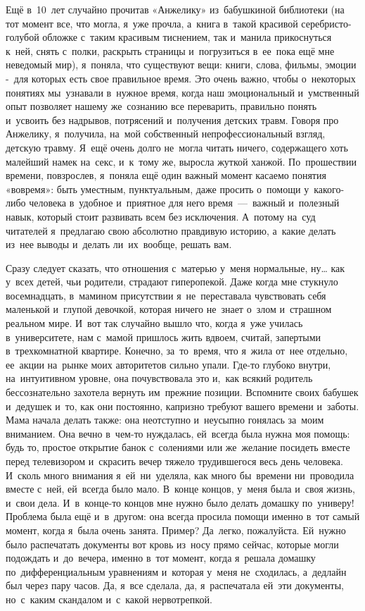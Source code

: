 
\lettrine[lines=3, loversize=0.1]{Е}{}щё в~10~лет случайно прочитав «Анжелику» из~бабушкиной библиотеки (на тот момент все, что могла, я~уже прочла, а~книга в~такой красивой серебристо-голубой обложке с~таким красивым тиснением, так и~манила прикоснуться к~ней, снять с~полки, раскрыть страницы и~погрузиться в~ее~пока ещё мне неведомый мир), я~поняла, что существуют вещи: книги, слова, фильмы, эмоции -~для которых есть свое правильное время.
Это очень важно, чтобы о~некоторых понятиях мы~узнавали в~нужное время, когда наш эмоциональный и~умственный опыт позволяет нашему же~сознанию все переварить, правильно понять и~усвоить без надрывов, потрясений и~получения детских травм.
Говоря про Анжелику, я~получила, на~мой собственный непрофессиональный взгляд, детскую травму.
Я~ещё очень долго не~могла читать ничего, содержащего хоть малейший намек на~секс, и~к~тому же, выросла жуткой ханжой.
По~прошествии времени, повзрослев, я~поняла ещё один важный момент касаемо понятия «вовремя»: быть уместным, пунктуальным, даже просить о~помощи у~какого-либо человека в~удобное и~приятное для него время~---~важный и~полезный навык, который стоит развивать всем без исключения.
А~потому на~суд читателей я~предлагаю свою абсолютно правдивую историю, а~какие делать из~нее выводы и~делать ли~их~вообще, решать вам.
 

Сразу следует сказать, что отношения с~матерью у~меня нормальные, ну… как у~всех детей, чьи родители, страдают гиперопекой.
Даже когда мне стукнуло восемнадцать, в~мамином присутствии я~не~переставала чувствовать себя маленькой и~глупой девочкой, которая ничего не~знает о~злом и~страшном реальном мире.
И~вот так случайно вышло что, когда я~уже училась в~университете, нам с~мамой пришлось жить вдвоем, считай, запертыми в~трехкомнатной квартире.
Конечно, за~то~время, что я~жила от~нее отдельно, ее~акции на~рынке моих авторитетов сильно упали.
Где-то глубоко внутри, на~интуитивном уровне, она почувствовала это и,~как всякий родитель бессознательно захотела вернуть им~прежние позиции.
Вспомните своих бабушек и~дедушек и~то, как они постоянно, капризно требуют вашего времени и~заботы.
Мама начала делать также: она неотступно и~неусыпно гонялась за~моим вниманием.
Она вечно в~чем-то нуждалась, ей~всегда была нужна моя помощь: будь то, простое открытие банок с~солениями или же~желание посидеть вместе перед телевизором и~скрасить вечер тяжело трудившегося весь день человека.
И~сколь много внимания я~ей~ни~уделяла, как много бы~времени ни~проводила вместе с~ней, ей~всегда было мало.
В~конце концов, у~меня была и~своя жизнь, и~свои дела.
И~в~конце-то концов мне нужно было делать домашку по~универу! Проблема была ещё и~в~другом: она всегда просила помощи именно в~тот самый момент, когда я~была очень занята.
Пример? Да~легко, пожалуйста.
Ей~нужно было распечатать документы вот кровь из~носу прямо сейчас, которые могли подождать и~до~вечера, именно в~тот момент, когда я~решала домашку по~дифференциальным уравнениям и~которая у~меня не~сходилась, а~дедлайн был через пару часов.
Да, я~все сделала, да, я~распечатала ей~эти документы, но~с~каким скандалом и~с~какой нервотрепкой.
 

